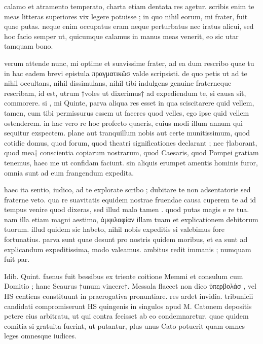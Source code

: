 


 calamo et atramento temperato, charta etiam dentata res agetur. scribis enim te meas litteras superiores vix legere potuisse ; in quo nihil eorum, mi frater, fuit quae putas. neque enim occupatus eram neque perturbatus nec iratus alicui, sed hoc facio semper ut, quicumque calamus in manus meas venerit, eo sic utar tamquam bono.

 verum attende nunc, mi optime et suavissime frater, ad ea dum rescribo quae tu in hac eadem brevi epistula πραγματικῶσ valde scripsisti. de quo petis ut ad te nihil occultans, nihil dissimulans, nihil tibi indulgens genuine fraterneque rescribam, id est, utrum †voles ut dixerimus† ad expediendum te, si causa sit, commorere. si , mi Quinte, parva aliqua res esset in qua sciscitarere quid vellem, tamen, cum tibi permissurus essem ut faceres quod velles, ego ipse quid vellem ostenderem. in hac vero re hoc profecto quaeris, cuius modi illum annum qui sequitur exspectem. plane aut tranquillum nobis aut certe munitissimum, quod cotidie domus, quod forum, quod theatri significationes declarant ; nec †laborant, quod mea† conscientia copiarum nostrarum, quod Caesaris, quod Pompei gratiam tenemus, haec me ut confidam faciunt. sin aliquis erumpet amentis hominis furor, omnia sunt ad eum frangendum expedita.

 haec ita sentio, iudico, ad te explorate scribo ; dubitare te non adsentatorie sed fraterne veto. qua re suavitatis equidem nostrae fruendae causa cuperem te ad id tempus venire quod dixeras, sed illud malo tamen . quod putas magis e re tua. nam illa etiam magni aestimo, ἀμφιλαφίαν illam tuam et explicationem debitorum tuorum. illud quidem sic habeto, nihil nobis expeditis si valebimus fore fortunatius. parva sunt quae desunt pro nostris quidem moribus, et ea sunt ad explicandum expeditissima, modo valeamus. ambitus redit immanis ; numquam fuit par.

 Idib. Quint. faenus fuit bessibus ex triente coitione Memmi et consulum cum Domitio ; hanc Scaurus †unum vincere†. Messala flaccet non dico ὑπερβολάσ , vel HS centiens constituunt in praerogativa pronuntiare. res ardet invidia. tribunicii candidati compromiserunt HS quingenis in singulos apud M. Catonem depositis petere eius arbitratu, ut qui contra fecisset ab eo condemnaretur. quae quidem comitia si gratuita fuerint, ut putantur, plus unus Cato potuerit quam omnes leges omnesque iudices.
